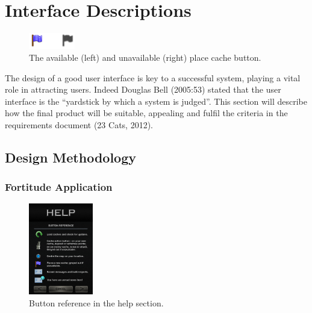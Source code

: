 \section{Interface Descriptions}


\begin{figure}
	\vspace{-25pt}
	\begin{center}
	\includegraphics[width=0.18\textwidth]{images/flags_greye}
	\caption{The available (left) and unavailable (right) place cache button.}
	\label{flags_greye}
	\end{center}
	\vspace{-10pt}
\end{figure}

The design of a good user interface is key to a successful system, playing a vital role in attracting users. Indeed Douglas Bell (2005:53) stated that the user interface is the ``yardstick by which a system is judged''. This section will describe how the final product will be suitable, appealing and fulfil the criteria in the requirements document (23 Cats, 2012).
\vspace{-10pt}

\subsection{Design Methodology}
\subsubsection{Fortitude Application}

\begin{figure}
	\vspace{-20pt}
	\begin{center}
	\includegraphics[width=0.25\textwidth]{images/help_mockup}
	\caption{Button reference in the help section.}
	\label{help_mockup}
	\end{center}
	\vspace{-20pt}
\end{figure}

